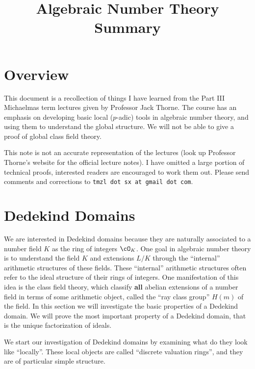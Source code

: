 \documentclass[11pt]{amsart}
\def\ntitle{Algebraic Number Theory Summary}
\begin{document}
\title{\ntitle}
\author{\nauthor}
\date{\ndate}
\maketitle

\tableofcontents                        %

\setcounter{section}{-1}

\section{Overview}

This document is a recollection of things I have learned from the Part III
Michaelmas term lectures given by Professor Jack Thorne.  The course has an
emphasis on developing basic local ($p$-adic) tools in algebraic number theory,
and using them to understand the global structure.  We will
not be able to give a proof of global class field theory.

\smallskip

This note is not an accurate representation of the lectures (look up Professor
Thorne's website for the official lecture notes).  I have omitted a large
portion of technical proofs, interested readers are encouraged to work them out.
Please send comments and corrections to \texttt{tmzl dot sx at gmail dot com}.

\section{Dedekind Domains}

We are interested in Dedekind domains because they are naturally associated to a
number field $K$ as the ring of integers $\cO_K$.  One goal in algebraic number
theory is to understand the field $K$ and extensions $L/K$ through the
``internal'' arithmetic structures of these fields.  These ``internal''
arithmetic structures often refer to the ideal structure of their rings of
integers.  One manifestation of this idea is the class field theory, which
classify \textbf{all} abelian extensions of a number field in terms of some
arithmetic object, called the ``ray class group'' $H(m)$ of the field. In this
section we will investigate the basic properties of a Dedekind domain.  We will
prove the most important property of a Dedekind domain, that is the unique
factorization of ideals.

We start our investigation of Dedekind domains by examining what do they look
like ``locally''.  These local objects are called ``discrete valuation rings'',
and they are of particular simple structure.
\end{document}
